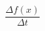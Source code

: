 \documentclass[preview, border=10pt]{standalone}
\begin{document}
$\dfrac{\Delta f(x)}{\Delta t}$
\end{document}
